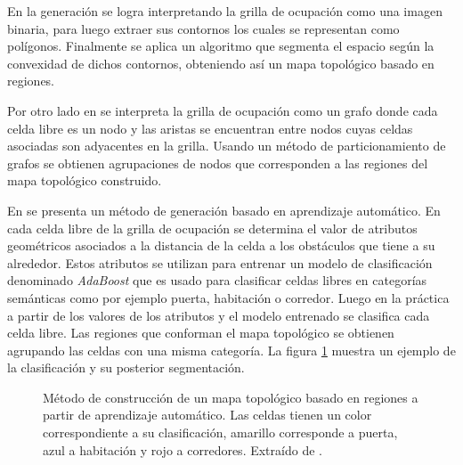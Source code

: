 En \cite{Fermin-Leon2017} la generación se logra interpretando la grilla de
ocupación como una imagen binaria, para luego extraer sus contornos los cuales
se representan como polígonos. Finalmente se aplica un algoritmo que segmenta
el espacio según la convexidad de dichos contornos, obteniendo así un mapa
topológico basado en regiones.

Por otro lado en \cite{zivkovic2006hierarchical} se interpreta la grilla de
ocupación como un grafo donde cada celda libre es un nodo y las aristas se
encuentran entre nodos cuyas celdas asociadas son adyacentes en la grilla.
Usando un método de particionamiento de grafos se obtienen agrupaciones de
nodos que corresponden a las regiones del mapa topológico construido.

En \cite{martinez2006semantic} se presenta un método de generación basado en
aprendizaje automático. En cada celda libre de la grilla de ocupación se
determina el valor de atributos geométricos asociados a la distancia de la
celda a los obstáculos que tiene a su alrededor. Estos atributos se utilizan
para entrenar un modelo de clasificación denominado \emph{AdaBoost}
\cite{schapire1999improved} que es usado para clasificar celdas libres en
categorías semánticas como por ejemplo puerta, habitación o corredor. Luego en
la práctica a partir de los valores de los atributos y el modelo entrenado se
clasifica cada celda libre. Las regiones que conforman el mapa topológico se
obtienen agrupando las celdas con una misma categoría. La figura
\ref{fig:ejMartinezTop} muestra un ejemplo de la clasificación y su posterior
segmentación.

\begin{figure}[H]
  \centering
  \qquad
  \caption[Método de construcción de un mapa topológico basado en regiones a partir de aprendizaje automático.]{Método de construcción de un mapa topológico basado en regiones a partir de aprendizaje automático. Las celdas tienen un color correspondiente a su clasificación, amarillo corresponde a puerta, azul a habitación y rojo a corredores. Extraído de \cite{martinez2006semantic}.}\label{fig:ejMartinezTop}
\end{figure}


